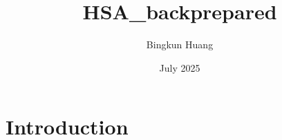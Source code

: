 \documentclass{article}
\title{HSA_backprepared}
\author{Bingkun Huang}
\date{July 2025}
\begin{document}
\maketitle

\section{Introduction}
\end{document}
